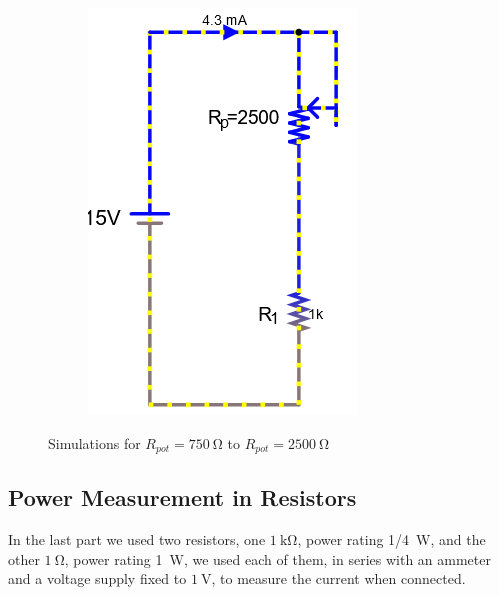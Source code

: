 \documentclass[a4paper]{article}
\begin{document}
\begin{figure}[H]
\begin{subfigure}{0.333\textwidth}
        \includegraphics[width=.9\linewidth]{pot10}
    \end{subfigure}
    \caption{Simulations for $R_{pot}=\SI{750}{\ohm}$ to $R_{pot}=\SI{2500}{\ohm}$}
\end{figure}
\subsection{Power Measurement in Resistors}
In the last part we used two resistors, one $\SI{1}{\kilo\ohm}$, power rating \SI{1/4}{\watt}, and the other
$\SI{1}{\ohm}$, power rating \SI{1}{\watt}, we used each of them, in series with an ammeter and a voltage
supply fixed to $\SI{1}{\volt}$, to measure the current when connected.
\end{document}
